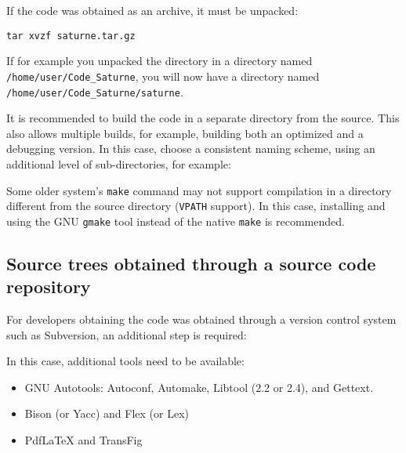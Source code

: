 \documentclass[a4paper,10pt,twoside]{csshortdoc}
\begin{document}
If the code was obtained as an archive, it must be unpacked:

\texttt{tar xvzf saturne.tar.gz}

If for example you unpacked the directory in a directory
named \texttt{/home/user/Code\_Saturne}, you will now
have a directory named \texttt{/home/user/Code\_Saturne/saturne}.

It is recommended to build the code in a separate directory from the source.
This also allows multiple builds, for example, building both an
optimized and a debugging version. In this case, choose a consistent
naming scheme, using an additional level of sub-directories,
for example:


Some older system's {\tt make} command may not support compilation
in a directory different from the source directory ({\tt VPATH}
support). In this case, installing and using the GNU {\tt gmake}
tool instead of the native {\tt make} is recommended.

\subsection{Source trees obtained through a source code repository\label{sec:preparerepo}}

For developers obtaining the code was obtained through a version control
system such as Subversion, an additional step is required:


In this case, additional tools need to be available:

\begin{itemize}
\item GNU Autotools: Autoconf, Automake, Libtool (2.2 or 2.4), and Gettext.
\item Bison (or Yacc) and Flex (or Lex)
\item PdfLaTeX and TransFig
\end{itemize}
\end{document}

